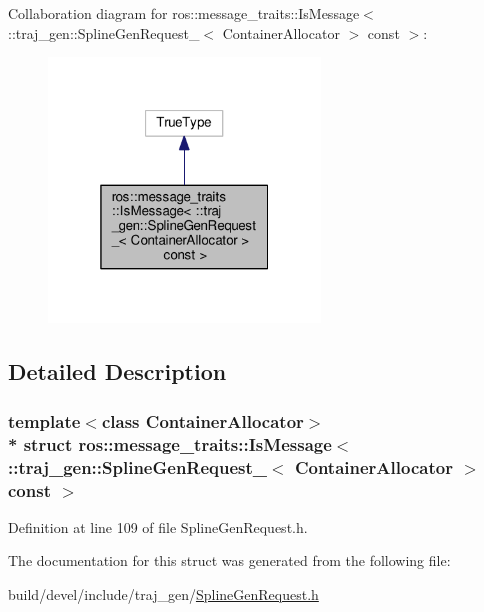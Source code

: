 Collaboration diagram for ros\+:\+:message\+\_\+traits\+:\+:Is\+Message$<$ \+:\+:traj\+\_\+gen\+:\+:Spline\+Gen\+Request\+\_\+$<$ Container\+Allocator $>$ const $>$\+:
\nopagebreak
\begin{figure}[H]
\begin{center}
\leavevmode
\includegraphics[width=205pt]{structros_1_1message__traits_1_1_is_message_3_01_1_1traj__gen_1_1_spline_gen_request___3_01_cont3a0993ea95a8efe8c1c724cefbd92c22}
\end{center}
\end{figure}


\subsection{Detailed Description}
\subsubsection*{template$<$class Container\+Allocator$>$\\*
struct ros\+::message\+\_\+traits\+::\+Is\+Message$<$ \+::traj\+\_\+gen\+::\+Spline\+Gen\+Request\+\_\+$<$ Container\+Allocator $>$ const  $>$}



Definition at line 109 of file Spline\+Gen\+Request.\+h.



The documentation for this struct was generated from the following file\+:\begin{DoxyCompactItemize}
\item 
build/devel/include/traj\+\_\+gen/\hyperlink{_spline_gen_request_8h}{Spline\+Gen\+Request.\+h}\end{DoxyCompactItemize}
